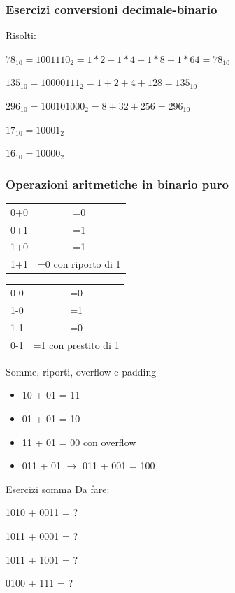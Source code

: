 \documentclass[handout]{beamer}
\begin{document}
\begin{frame}
\frametitle{Esercizi conversioni decimale-binario}
Risolti:

$78_{10} = 1001110_{2} = 1*2+1*4+1*8+1*64 = 78_{10}$

$135_{10} = 10000111_{2} = 1+2+4+128 = 135_{10}$

$296_{10} = 100101000_{2} = 8+32+256 = 296_{10}$

$17_{10} = 10001_{2}$

$16_{10} = 10000_{2}$

\end{frame}

\begin{frame}
\frametitle{Operazioni aritmetiche in binario puro}
\begin{table}[h]
	\begin{tabular}{c|c}
		0+0 & =0 \\
		0+1 & =1 \\
		1+0 & =1 \\
		1+1 & =0 con riporto di 1
	\end{tabular}
\end{table}
\begin{table}[h]
	\begin{tabular}{c|c}
		0-0 & =0 \\
		1-0 & =1 \\
		1-1 & =0 \\
		0-1 & =1 con prestito di 1
	\end{tabular}
\end{table}
\end{frame}

\begin{frame}{Somme, riporti, overflow e padding}
\begin{itemize}
	\item 10 + 01 = 11
	\item 01 + 01 = 10
	\item 11 + 01 = 00 con overflow
	\item 011 + 01 $\rightarrow$ 011 + 001 = 100
\end{itemize}
\end{frame}

\begin{frame}{Esercizi somma}
Da fare:

1010 + 0011 = ?

1011 + 0001 = ?

1011 + 1001 = ?

0100 + 111 = ?
\end{frame}
\end{document}
